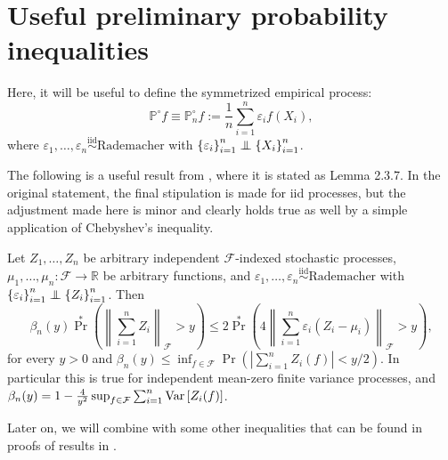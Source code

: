 
\section{Useful preliminary probability inequalities}

Here, it will be useful to define the symmetrized empirical process:
\begin{equation*}
  \mathbb{P}^{\circ} f \equiv \mathbb{P}^{\circ}_{n} f := \frac{1}{n} \sum_{i =
  1}^{n} \varepsilon_{i} f \left( X_{i} \right),
\end{equation*}
where \(\varepsilon_{1}, \dots, \varepsilon_{n} \overset{\mathrm{iid}}{\sim}
\text{Rademacher}\) with \(\left\{ \varepsilon_{i} \right\}_{i = 1}^{n} \mathrel{\perp \mspace{-11mu} \perp}
\left\{ X_{i} \right\}_{i = 1}^{n}\).

The following is a useful result from
\citet{2023vandervaartWeakConvergenceEmpirical}, where it is stated as Lemma
2.3.7.
In the original statement, the final stipulation is made for iid processes, but
the adjustment made here is minor and clearly holds true as well by a simple
application of Chebyshev's inequality.

\begin{lemma}
\label{lem--vdvw23-lem-2-3-7}
Let \(Z_{1}, \dots, Z_{n}\) be arbitrary independent \(\mathcal{F}\)-indexed
stochastic processes, \(\mu_{1}, \dots, \mu_{n} : \mathcal{F} \to \mathbb{R}\)
be arbitrary functions, and \(\varepsilon_{1}, \dots, \varepsilon_{n}
\overset{\mathrm{iid}}{\sim}
\text{Rademacher}\) with \(\left\{ \varepsilon_{i} \right\}_{i = 1}^{n} \mathrel{\perp \mspace{-11mu} \perp}
\left\{ Z_{i} \right\}_{i = 1}^{n}\).
Then
\begin{equation*}
  \beta_{n} (y) \Pr^{\ast} \left( \left\| \sum_{i = 1}^{n} Z_{i}
  \right\|_{\mathcal{F}} > y \right) \leq 2 \Pr^{\ast} \left( 4 \left\| \sum_{i
  = 1}^{n} \varepsilon_{i} \left( Z_{i} - \mu_{i} \right) \right\|_{\mathcal{F}}
  > y \right),
\end{equation*}
for every \(y > 0\) and \(\beta_{n} (y) \leq \inf_{f \in \mathcal{F}} \Pr \left(
\left| \sum_{i = 1}^{n} Z_{i} (f) \right| < y / 2 \right)\).
In particular this is true for independent mean-zero finite variance processes,
and \(\beta_{n} (y) = 1 - \frac{4}{y^{2}} \sup_{f \in \mathcal{F}} \sum_{i =
1}^{n} \mathrm{Var} \left[ Z_{i} (f) \right]\).
\end{lemma}

Later on, we will combine  with some other
inequalities that can be found in proofs of results in
\citet{1984pollardConvergenceStochasticProcesses}.


